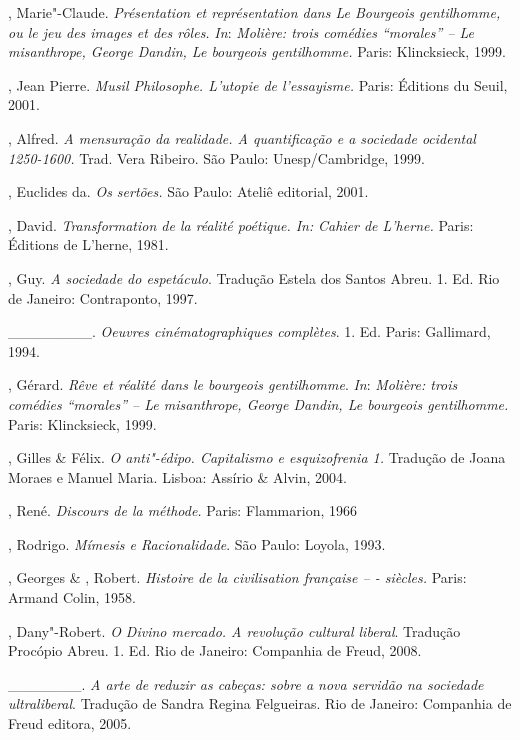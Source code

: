 \begin{Parskip}
, Marie"-Claude. \emph{Présentation et représentation dans Le
Bourgeois gentilhomme, ou le jeu des images et des rôles.} \emph{In}:
\emph{Molière: trois comédies ``morales'' -- Le misanthrope, George
Dandin, Le bourgeois gentilhomme.} Paris: Klincksieck, 1999.

, Jean Pierre. \emph{Musil Philosophe. L'utopie de
l'essayisme.} Paris: Éditions du Seuil, 2001.

, Alfred. \emph{A mensuração da realidade. A quantificação e a
sociedade ocidental 1250-1600.} Trad. Vera Ribeiro. São Paulo: Unesp/Cambridge, 1999.

, Euclides da. \emph{Os sertões.} São Paulo: Ateliê editorial, 2001.

, David. \emph{Transformation de la réalité poétique. In:}
\emph{Cahier de L'herne.} Paris: Éditions de L'herne, 1981.

, Guy. \emph{A sociedade do espetáculo}. Tradução Estela
dos Santos Abreu. 1. Ed. Rio de Janeiro: Contraponto, 1997.

\_\_\_\_\_\_\_\_. \emph{Oeuvres cinématographiques complètes}.
1. Ed. Paris: Gallimard, 1994.

, Gérard. \emph{Rêve et réalité dans le bourgeois gentilhomme}.
\emph{In}: \emph{Molière: trois comédies ``morales'' -- Le misanthrope, George
Dandin, Le bourgeois gentilhomme.} Paris: Klincksieck, 1999.

, Gilles \&  Félix. \emph{O anti"-édipo. Capitalismo e
esquizofrenia 1.} Tradução de Joana Moraes e Manuel Maria. Lisboa: Assírio \& Alvin, 2004.

, René. \emph{Discours de la méthode.} Paris: Flammarion, 1966

, Rodrigo. \emph{Mímesis e Racionalidade}. São Paulo: Loyola, 1993.

, Georges \& , Robert. \emph{Histoire de la civilisation
française -- - siècles.} Paris: Armand Colin, 1958.

, Dany"-Robert. \emph{O Divino mercado. A revolução cultural
liberal}. Tradução Procópio Abreu. 1. Ed. Rio de Janeiro: Companhia de Freud, 2008.

\_\_\_\_\_\_\_. \emph{A arte de reduzir as cabeças: sobre a nova
servidão na sociedade ultraliberal}. Tradução de Sandra Regina
Felgueiras. Rio de Janeiro: Companhia de Freud editora, 2005.


\end{Parskip}
